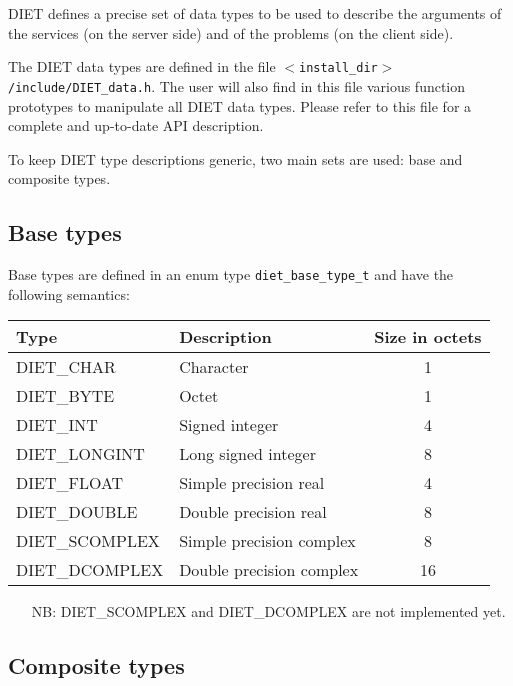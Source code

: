 DIET defines a precise set of data types to be used to describe the arguments of
the services (on the server side) and of the problems (on the client side).

The DIET data types are defined in the file
\texttt{$<$install\_dir$>$/include/DIET\_data.h}. The user will also find in
this file various function prototypes to manipulate all DIET data types. Please
refer to this file for a complete and up-to-date API description.

To keep DIET type descriptions generic, two main sets are used: base and
composite types.

\subsection{Base types}
\label{ssec:base}

Base types are defined in an enum type \texttt{diet\_base\_type\_t} and have the
following semantics:
\begin{center}
\footnotesize
\begin{tabular}{|l|l|c|}
\hline
\textbf{Type}&\textbf{Description}&\textbf{Size in octets}\\
\hline
\textsf{DIET\_CHAR}     & Character                &  1\\
\textsf{DIET\_BYTE}     & Octet                    &  1\\
\textsf{DIET\_INT}      & Signed integer           &  4\\
\textsf{DIET\_LONGINT}  & Long signed integer      &  8\\
\textsf{DIET\_FLOAT}    & Simple precision real    &  4\\
\textsf{DIET\_DOUBLE}   & Double precision real    &  8\\
\hline\hline
\textsf{DIET\_SCOMPLEX} & Simple precision complex &  8\\
\textsf{DIET\_DCOMPLEX} & Double precision complex & 16\\
\hline
\end{tabular}
\end{center}

\begin{itemize}
\item[NB:] \textsf{DIET\_SCOMPLEX} and \textsf{DIET\_DCOMPLEX} are not implemented yet.
\end{itemize}


\subsection{Composite types}
\label{ssec:complex}

